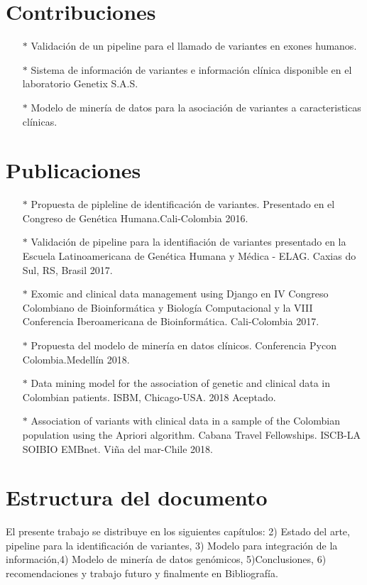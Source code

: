 \section*{Contribuciones}

\begin{itemize}
	\item[$*$] Validación de un pipeline para el llamado de variantes en exones humanos. 
	\item[$*$] Sistema de información de variantes e información clínica  disponible en el laboratorio Genetix S.A.S.
	\item[$*$] Modelo de minería de datos para la asociación de variantes a caracteristicas clínicas. 

\end{itemize}

\section*{Publicaciones}
\begin{itemize}
	\item[$*$] Propuesta de pipleline de identificación de variantes. Presentado en el Congreso de Genética Humana.Cali-Colombia 2016.
	\item[$*$] Validación de pipeline para la identifiación de variantes presentado en la Escuela Latinoamericana de Genética Humana y Médica - ELAG. Caxias do Sul, RS, Brasil 2017.
	\item[$*$] Exomic and clinical data management using Django en IV Congreso Colombiano de Bioinformática y Biología Computacional y la VIII Conferencia Iberoamericana de Bioinformática. Cali-Colombia 2017.
	\item[$*$] Propuesta del  modelo de minería en datos clínicos. Conferencia Pycon Colombia.Medellín 2018.
	\item[$*$] Data mining model for the association of genetic and clinical data in Colombian patients.  ISBM, Chicago-USA. 2018 Aceptado. 
	\item[$*$] Association of variants with clinical data in a sample of the Colombian population using the Apriori algorithm. Cabana Travel Fellowships. ISCB-LA SOIBIO EMBnet. Viña del mar-Chile 2018. 	
\end{itemize}
	

\section*{Estructura del documento}

El presente trabajo se distribuye en los siguientes capítulos: 2) Estado del arte, pipeline para la identificación de variantes, 3) Modelo para integración de la información,4) Modelo de minería de datos genómicos, 5)Conclusiones, 6) recomendaciones y trabajo futuro y finalmente en Bibliografía.